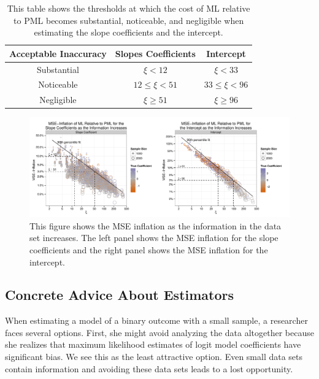 \documentclass[12pt]{article}
\begin{document}
\begin{table}[h]
\centering
\begin{tabular}{ccc}
\hline
Acceptable Inaccuracy   &  Slopes Coefficients     & Intercept        \\ \hline
Substantial & $\xi < 12$         & $\xi < 33$          \\
Noticeable  & $12 \leq \xi < 51$ & $33 \leq \xi < 96$ \\
Negligible  & $\xi \geq 51$        & $\xi \geq 96$        
\end{tabular}
\caption{This table shows the thresholds at which the cost of ML relative to PML becomes substantial, noticeable, and negligible when estimating the slope coefficients and the intercept.}\label{tbl:thresholds}
\end{table}

\begin{figure}[h]
\begin{center}
\includegraphics[width = \textwidth]{figs/mse-infl-larger-samples.pdf}
\caption{This figure shows the MSE inflation as the information in the data set increases. The left panel shows the MSE inflation for the slope coefficients and the right panel shows the MSE inflation for the intercept.}\label{fig:thresholds}
\end{center}
\end{figure}

\subsection*{Concrete Advice About Estimators}

When estimating a model of a binary outcome with a small sample, a researcher faces several options. 
First, she might avoid analyzing the data altogether because she realizes that maximum likelihood estimates of logit model coefficients have significant bias.
We see this as the least attractive option.
Even small data sets contain information and avoiding these data sets leads to a lost opportunity.
\end{document}
